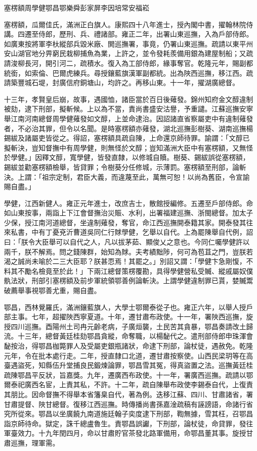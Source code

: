 
\begin{pinyinscope}
塞楞額周學健鄂昌鄂樂舜彭家屏李因培常安福崧

塞楞額，瓜爾佳氏，滿洲正白旗人。康熙四十八年進士，授內閣中書，擢翰林院侍講。四遷至侍郎，歷刑、兵、禮諸部。雍正二年，出署山東巡撫，入為戶部侍郎。如廣東按將軍李杕縱部兵毀米廠、閧巡撫署，事竟，仍署山東巡撫。疏請以東平州安山湖官地分畀窮民栽柳捕魚為業，上許之，並令發耗羨備用銀為建屋制船；又疏請浚柳長河，開引河二，疏積水。復入為工部侍郎，緣事奪官。乾隆元年，賜副都統銜，如索倫、巴爾虎練兵。尋授鑲藍旗漢軍副都統。出為陜西巡撫，移江西。疏請築豐城石堤，封廣信府銅塘山，均許之。再移山東。十一年，擢湖廣總督。

十三年，孝賢皇后崩，故事，遇國恤，諸臣當於百日後薙發。錦州知府金文醇違制被劾，逮下刑部，擬斬候。上以為不當，責尚書盛安沽譽，予重譴。江蘇巡撫安寧舉江南河南總督周學健薙發如文醇，上並命逮治。因詔諸直省察屬吏中有違制薙發者，不必治其罪，但令以名聞。是時塞楞額亦薙發，湖北巡撫彭樹葵、湖南巡撫楊錫紱及諸屬吏皆從之。得詔，塞楞額具疏自陳，上命還京師待罪。諭謂：「文醇已擬斬決，豈知督撫中有周學健，則無怪於文醇；豈知滿洲大臣中有塞楞額，又無怪於學健。」因釋文醇，寬學健，皆發直隸，以修城自贖。樹葵、錫紱誤從塞楞額，錫紱並勸塞楞額檢舉，皆貸罪；令樹葵分任修城，示薄罰。塞楞額至刑部，論斬決。上謂：「祖宗定制，君臣大義，而違蔑至此，萬無可恕！以尚為舊臣，令宣諭賜自盡。」

學健，江西新健人。雍正元年進士，改庶吉士，散館授編修。五遷至戶部侍郎。命如山東按事，兩詣上下江會督撫治災賑、水利，出署福建巡撫、浙閩總督。加太子少保，授江南河道總督，坐違制薙發，奪官，命江西巡撫開泰籍其家。開泰發其往來私書，中有丁憂兗沂曹道吳同仁行賕學健，乞舉以自代。上為罷陳舉自代例，詔曰：「朕令大臣舉可以自代之人，凡以拔茅茹、顯俊乂之意也。今同仁囑學健許以兩千，朕不解焉。問之錢陳群，始知為賕。夫考績黜陟，何可為苞苴之門，豈朕若渴之誠尚未喻於二三大臣耶？朕甚恧焉！其罷之。」別詔又謂：「學健卞急剛愎，不料其不勵名檢竟至於此！」下兩江總督策楞覆勘，具得學健營私受贓、縱戚屬奴僕骫法狀，刑部引塞楞額及前步軍統領鄂善例論斬決。上謂學健違制罪已貰，婪贓鬻破薦舉事視鄂善尤重，賜自盡。

鄂昌，西林覺羅氏，滿洲鑲藍旗人，大學士鄂爾泰從子也。雍正六年，以舉人授戶部主事。七年，超擢陜西寧夏道。十年，遷甘肅布政使。十一年，署陜西巡撫，旋授四川巡撫。酉陽州土司冉元齡老病，子廣烜襲，土民苦其貪暴，鄂昌奏請改土歸流。十三年，總督黃廷桂劾鄂昌貪縱，命奪職，以楊馝代之。遣刑部侍郎申珠渾會馝按治，得鄂昌枷斃罪人及受屬吏銀瓶諸狀，命逮下刑部，論杖徒，遇赦免。乾隆元年，令在批本處行走。二年，授直隸口北道，遷甘肅按察使。山西民梁玥等在高臺遇盜死，知縣伍升堂捕良民鍛煉論罪，鄂昌雪其冤，得真盜置之法。巡撫黃廷桂疏陳鄂昌平反狀，旨嘉獎。九年，遷廣西布政使。十一年，署廣西巡撫。疏請以鄂爾泰祀廣西名宦，上責其私，不許。十二年，疏自陳舉布政使李錫泰自代，上復責其朋比。因命督撫不得舉本省籓臬自代，著為例。迭移江蘇、四川、甘肅諸省，署甘肅提督、陜甘總督。復移江西巡撫。時傳播尚書孫嘉淦疏稿有誣謗語，命諸行省究所從來。鄂昌以坐廣饒九南道施廷翰子奕度逮下刑部，鞫無據，雪其枉，召鄂昌詣京師待命。獄定，誅千總盧魯生。責鄂昌誤讞，下刑部，論杖徒，命貸罪，發往軍臺效力。十九年閏四月，命以甘肅貯官茶發北路軍備用，命鄂昌董其事。旋授甘肅巡撫，理軍需。


\end{pinyinscope}
